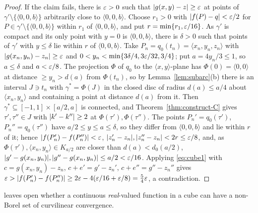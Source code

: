 \begin{proof}
If the claim fails, there is $\varepsilon>0$ such that $\lvert g(x,y)-z\rvert\ge\varepsilon$ at points of $\gamma'\setminus\{\langle0,0,b\rangle\}$ arbitrarily close to $\langle0,0,b\rangle$.
Choose $r_1>0$ with $\lvert f(P)-q\rvert<\varepsilon/2$ for $P\in\gamma'\setminus\{\langle0,0,b\rangle\}$ within $r_1$ of $\langle0,0,b\rangle$, and put $r=\min\{r_1,\varepsilon/16\}$. As $\gamma'$
is compact and its only point with $y=0$ is $\langle0,0,b\rangle$, there is $\delta>0$ such that points of $\gamma'$ with $y\le\delta$ lie within $r$ of
$\langle0,0,b\rangle$. Take $P_n=q_0(t_n)=\langle x_n,y_n,z_n\rangle$ with $\lvert g(x_n,y_n)-z_n\rvert\ge\varepsilon$ and $0<y_n<\min\{3\delta/4,3\varepsilon/32,3/4\}$; put
$a=4y_n/3\le1$, so $a\le\delta$ and $a<\varepsilon/8$. The projection $\Phi$ of $q_0$ to the $\langle x,y\rangle$-plane has $\Phi(0)=\langle0,0\rangle$ at distance
$\ge y_n>d(a)$ from $\Phi(t_n)$, so by Lemma~\ref{lem:subarc}(b) there is an interval $J\ni t_n$ with $\gamma^*=\Phi(J)$ in the closed disc of radius
$d(a)\le a/4$ about $\langle x_n,y_n\rangle$ and containing a point at distance $d(a)$ from it. Then $\gamma^*\subseteq[-1,1]\times[a/2,a]$
is connected, and Theorem~\ref{thm:construct-C} gives $\tau',\tau''\in J$ with $\lvert k'-k''\rvert\ge2$ at $\Phi(\tau'),\Phi(\tau'')$. The points
$P_n'=q_0(\tau')$, $P_n''=q_0(\tau'')$ have $a/2\le y\le a\le\delta$, so they differ from $\langle0,0,b\rangle$ and lie within $r$ of it; hence
$\lvert f(P_n')-f(P_n'')\rvert<\varepsilon$, $\lvert z_n'-z_n\rvert,\lvert z_n''-z_n\rvert<2r\le\varepsilon/8$, and, as $\Phi(\tau'),\langle x_n,y_n\rangle\in K_{a/2}$ are closer than
$d(a)<d_0(a/2)$, $\lvert g'-g(x_n,y_n)\rvert,\lvert g''-g(x_n,y_n)\rvert\le a/2<\varepsilon/16$. Applying \eqref{eq:cube1} with $c=g(x_n,y_n)-z_n$, $c+e'=g'-z_n'$,
$c+e''=g''-z_n''$ gives $\varepsilon>\lvert f(P_n')-f(P_n'')\rvert\ge2\varepsilon-4(\varepsilon/16+\varepsilon/8)=\frac54\varepsilon$, a contradiction.
\end{proof}

\begin{remark}
\cite{PAMS} leaves open whether a continuous \emph{real}-valued function in a cube can have a non-Borel set of curvilinear convergence.
\end{remark}
